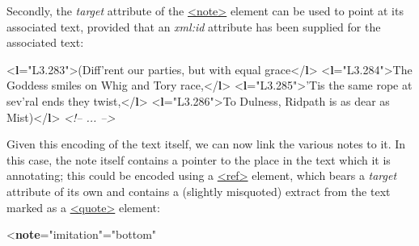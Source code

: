 Secondly, the {\itshape target} attribute of the \hyperref[TEI.note]{<note>} element can be used to point at its associated text, provided that an {\itshape xml:id} attribute has been supplied for the associated text: \par\bgroup{}\exampleFont \begin{shaded}\noindent\mbox{}{<\textbf{l}\hspace*{1em}{xml:id}="{L3.283}">}(Diff'rent our parties, but with equal grace{</\textbf{l}>}\mbox{}\newline 
{<\textbf{l}\hspace*{1em}{xml:id}="{L3.284}">}The Goddess smiles on Whig and Tory race,{</\textbf{l}>}\mbox{}\newline 
{<\textbf{l}\hspace*{1em}{xml:id}="{L3.285}">}'Tis the same rope at sev'ral ends they twist,{</\textbf{l}>}\mbox{}\newline 
{<\textbf{l}\hspace*{1em}{xml:id}="{L3.286}">}To Dulness, Ridpath is as dear as Mist){</\textbf{l}>}\mbox{}\newline 
\textit{<!-- ... -->}\end{shaded}\egroup\par \noindent  Given this encoding of the text itself, we can now link the various notes to it. In this case, the note itself contains a pointer to the place in the text which it is annotating; this could be encoded using a \hyperref[TEI.ref]{<ref>} element, which bears a {\itshape target} attribute of its own and contains a (slightly misquoted) extract from the text marked as a \hyperref[TEI.quote]{<quote>} element: \par\bgroup{}\exampleFont \begin{shaded}\noindent\mbox{}{<\textbf{note}\hspace*{1em}{type}="{imitation}"\hspace*{1em}{place}="{bottom}"\mbox{}\newline 
}
\end{shaded}

